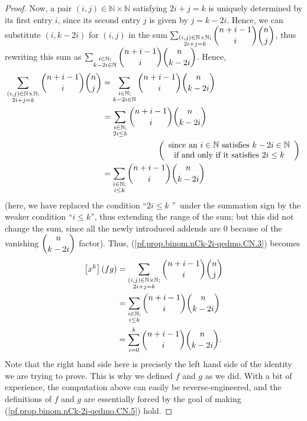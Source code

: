 \begin{proof}
Now, a pair $\left(  i,j\right)  \in\mathbb{N}\times\mathbb{N}$ satisfying
$2i+j=k$ is uniquely determined by its first entry $i$, since its second entry
$j$ is given by $j=k-2i$. Hence, we can substitute $\left(  i,k-2i\right)  $
for $\left(  i,j\right)  $ in the sum $\sum_{\substack{\left(  i,j\right)
\in\mathbb{N}\times\mathbb{N};\\2i+j=k}}\dbinom{n+i-1}{i}\dbinom{n}{j}$, thus
rewriting this sum as $\sum_{\substack{i\in\mathbb{N};\\k-2i\in\mathbb{N}%
}}\dbinom{n+i-1}{i}\dbinom{n}{k-2i}$. Hence,%
\begin{align*}
\sum_{\substack{\left(  i,j\right)  \in\mathbb{N}\times\mathbb{N}%
;\\2i+j=k}}\dbinom{n+i-1}{i}\dbinom{n}{j}  &  =\sum_{\substack{i\in
\mathbb{N};\\k-2i\in\mathbb{N}}}\dbinom{n+i-1}{i}\dbinom{n}{k-2i}\\
&  =\sum_{\substack{i\in\mathbb{N};\\2i\leq k}}\dbinom{n+i-1}{i}\dbinom
{n}{k-2i}\\
&  \ \ \ \ \ \ \ \ \ \ \ \ \ \ \ \ \ \ \ \ \left(
\begin{array}
[c]{c}%
\text{since an }i\in\mathbb{N}\text{ satisfies }k-2i\in\mathbb{N}\\
\text{if and only if it satisfies }2i\leq k
\end{array}
\right) \\
&  =\sum_{\substack{i\in\mathbb{N};\\i\leq k}}\dbinom{n+i-1}{i}\dbinom
{n}{k-2i}%
\end{align*}
(here, we have replaced the condition \textquotedblleft$2i\leq k$%
\textquotedblright\ under the summation sign by the weaker condition
\textquotedblleft$i\leq k$\textquotedblright, thus extending the range of the
sum; but this did not change the sum, since all the newly introduced addends
are $0$ because of the vanishing $\dbinom{n}{k-2i}$ factor). Thus,
(\ref{pf.prop.binom.nCk-2i-qedmo.CN.3}) becomes%
\begin{align}
\left[  x^{k}\right]  \left(  fg\right)   &  =\sum_{\substack{\left(
i,j\right)  \in\mathbb{N}\times\mathbb{N};\\2i+j=k}}\dbinom{n+i-1}{i}%
\dbinom{n}{j}\nonumber\\
&  =\sum_{\substack{i\in\mathbb{N};\\i\leq k}}\dbinom{n+i-1}{i}\dbinom
{n}{k-2i}\nonumber\\
&  =\sum_{i=0}^{k}\dbinom{n+i-1}{i}\dbinom{n}{k-2i}.
\label{pf.prop.binom.nCk-2i-qedmo.CN.5}%
\end{align}
Note that the right hand side here is precisely the left hand side of the
identity we are trying to prove. This is why we defined $f$ and $g$ as we did.
With a bit of experience, the computation above can easily be
reverse-engineered, and the definitions of $f$ and $g$ are essentially forced
by the goal of making (\ref{pf.prop.binom.nCk-2i-qedmo.CN.5}) hold.


\end{proof}
